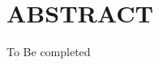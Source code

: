 
\chapter*{ABSTRACT}\thispagestyle{headings}
%
\begin{otherlanguage}{english}

To Be completed

\end{otherlanguage}
